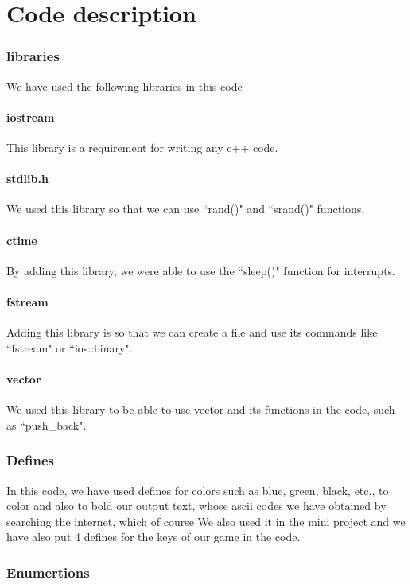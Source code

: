 \documentclass[12pt,a4paper]{article}
\begin{document}
	\newpage
	\setcounter{section}{0}
	\part{Code description}\label{description}
	
	\section{libraries}\label{description.libraries}
	We have used the following libraries in this code
	\subsection{iostream}
	This library is a requirement for writing any c++ code.
	\subsection{stdlib.h}
	We used this library so that we can use ``rand()" and ``srand()" functions.
	\subsection{ctime}
	By adding this library, we were able to use the ``sleep()" function for interrupts.
	\subsection{fstream}
	Adding this library is so that we can create a file and use its commands like ``fstream" or ``ios::binary".
	\subsection{vector}
	We used this library to be able to use vector and its functions in the code, such as ``push\_back".
	\section{Defines}\label{description.defines}
	In this code, we have used defines for colors such as blue, green, black, etc., to color and also to bold our output text, whose ascii codes we have obtained by searching the internet, 
	which of course We also used it in the mini project and we have also put 4 defines for the keys of our game in the code.
	\section{Enumertions}\label{description.Enums}
\end{document}
